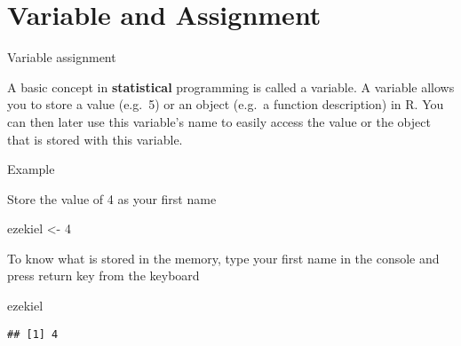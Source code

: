 \documentclass[
  ignorenonframetext,
]{beamer}
\newenvironment{Shaded}{\begin{snugshade}}{\end{snugshade}}
\newcommand{\DecValTok}[1]{\textcolor[rgb]{0.00,0.00,0.81}{#1}}
\newcommand{\NormalTok}[1]{#1}
\newcommand{\StringTok}[1]{\textcolor[rgb]{0.31,0.60,0.02}{#1}}
\begin{document}
\section{Variable and Assignment}
\begin{frame}[fragile]{Variable assignment}
\protect\hypertarget{variable-assignment}{}

A basic concept in \textbf{statistical} programming is called a
variable. A variable allows you to store a value (e.g.~5) or an object
(e.g.~a function description) in R. You can then later use this
variable's name to easily access the value or the object that is stored
with this variable.

\begin{block}{Example}

Store the value of 4 as your first name

\begin{Shaded}
\begin{Highlighting}[]
\NormalTok{ezekiel <-}\StringTok{ }\DecValTok{4}
\end{Highlighting}
\end{Shaded}

To know what is stored in the memory, type your first
name in the console and press return key from the keyboard

\begin{Shaded}
\begin{Highlighting}[]
\NormalTok{ezekiel}
\end{Highlighting}
\end{Shaded}

\begin{verbatim}
## [1] 4
\end{verbatim}

\end{block}

\end{frame}
\end{document}
